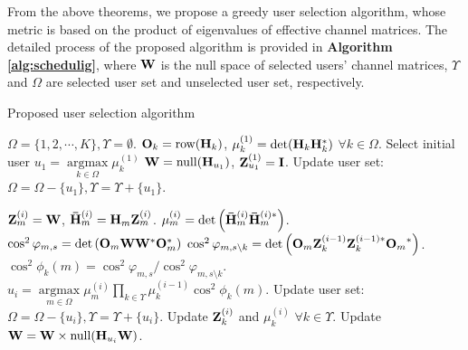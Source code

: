 \documentclass[journal,twoside]{IEEEtranTCOM}
\begin{document}
From the above theorems, we propose a greedy user selection algorithm, whose metric is based on the product of eigenvalues of effective channel matrices.
The detailed process of the proposed algorithm is provided in \textbf{Algorithm \ref{alg:schedulig}}, where $\bf{W}$ is the null space of selected users' channel matrices, $\Upsilon$ and $\Omega$ are selected user set and unselected user set, respectively.

\begin{algorithm} \caption{Proposed user selection algorithm}\label{alg:schedulig}
\begin{algorithmic}[1]
\State $\Omega  = \{ 1,2, \cdots ,K\} ,\Upsilon  = \emptyset$.
\State ${\bf{O}}_{k} = \mathrm{row}({{\bf{H}}_k})$, $\mu_k^{(1)}=\det({{\bf{H}}_k}{{\bf{H}}_k^*})$ $\forall k \in \Omega$.
\State Select initial user ${u_1} = \mathop {\arg \max }\limits_{k \in \Omega } \mu_k^{(1)}$
\State ${\bf{W}} = \mathrm{null}({{\bf{H}}_{{u_1}}})$, ${\bf{Z}}_{u_1}^{(1)} = \bf{I}$.
\State Update user set: $\Omega  = \Omega  - \{ {u_1}\} ,\Upsilon  = \Upsilon  + \{ {u_1}\}$.

        \State ${\bf{Z}}_m^{(i)} = {\bf{W}}$, ${\bf{\bar H}}_m^{(i)} = {{\bf{H}}_m}{\bf{Z}}_m^{(i)}$.
        \State ${\mu}_m^{(i)}=\det\left({\bf{\bar H}}_m^{(i)} {\bf{\bar H}}_m^{(i)*}\right)$.
        \State ${\cos^2 \varphi_{{m}, s}}= {\det \left( {\bf{O}}_{m} {\bf{W}} {\bf{W}}^* {\bf{O}}^*_{m}\right)}$
        \State ${\cos^2 \varphi_{{m}, s \setminus k }}={\det\left({{\bf{O}}_{m}}{\bf{Z}}_k^{(i-1)} {\bf{Z}}_k^{(i-1)*}{{\bf{O}}_{m}}^*\right)}$.
        \State ${\cos^2{\phi}_k(m)}= {\cos^2 \varphi_{{m}, s}} / {\cos^2 \varphi_{{m}, s \setminus k }}$.
        \EndFor
    \EndFor
    \State ${u_i}  =  \mathop {\arg \max }\limits_{m \in \Omega } \mu_m^{(i)} \prod\limits_{k \in \Upsilon} {\mu_k^{(i-1)}} {\cos^2{\phi}_k(m)}$.
    \State Update user set: $\Omega  = \Omega  - \{ {u_i}\} ,\Upsilon  = \Upsilon  + \{ {u_i}\}$.
    \State Update ${\bf{Z}}_{k}^{(i)}$ and ${\mu_k^{(i)}}$ $\forall k \in \Upsilon$.
    \State Update ${\bf{W}}={\bf{W}} \times \mathrm{null} ({\bf{H}}_{u_{i}}{\bf{W}})$.
\EndFor

\end{algorithmic}
\end{algorithm}
\end{document}
